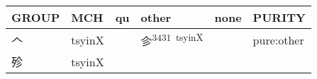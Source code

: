 \documentclass[14pt,a4paper]{scrartcl}
\begin{document}
\begin{longtable}[c]{@{}llllll@{}}
\toprule
\begin{minipage}[b]{0.14\columnwidth}\raggedright\strut
GROUP
\strut\end{minipage} &
\begin{minipage}[b]{0.14\columnwidth}\raggedright\strut
MCH
\strut\end{minipage} &
\begin{minipage}[b]{0.14\columnwidth}\raggedright\strut
qu
\strut\end{minipage} &
\begin{minipage}[b]{0.14\columnwidth}\raggedright\strut
other
\strut\end{minipage} &
\begin{minipage}[b]{0.14\columnwidth}\raggedright\strut
none
\strut\end{minipage} &
\begin{minipage}[b]{0.14\columnwidth}\raggedright\strut
PURITY
\strut\end{minipage}\tabularnewline
\midrule
\endhead
\begin{minipage}[t]{0.14\columnwidth}\raggedright\strut
𠆢
\strut\end{minipage} &
\begin{minipage}[t]{0.14\columnwidth}\raggedright\strut
tsyinX
\strut\end{minipage} &
\begin{minipage}[t]{0.14\columnwidth}\raggedright\strut
\strut\end{minipage} &
\begin{minipage}[t]{0.14\columnwidth}\raggedright\strut
㐱\textsuperscript{3431~tsyinX}
\strut\end{minipage} &
\begin{minipage}[t]{0.14\columnwidth}\raggedright\strut
\strut\end{minipage} &
\begin{minipage}[t]{0.14\columnwidth}\raggedright\strut
pure:other
\strut\end{minipage}\tabularnewline
\begin{minipage}[t]{0.14\columnwidth}\raggedright\strut
殄
\strut\end{minipage} &
\begin{minipage}[t]{0.14\columnwidth}\raggedright\strut
tsyinX
\strut\end{minipage} &
\begin{minipage}[t]{0.14\columnwidth}\raggedright\strut
\strut\end{minipage} &

\end{longtable}
\end{document}
